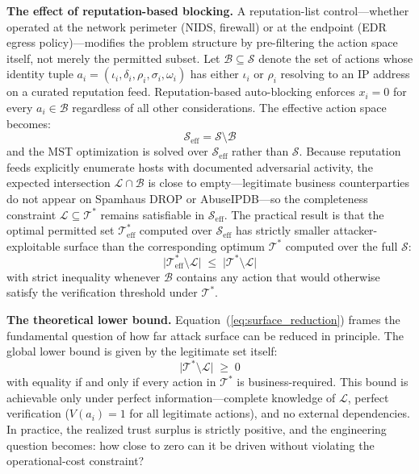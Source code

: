 \documentclass[unnumsec,webpdf,contemporary,large]{oup-authoring-template}
\theoremstyle{thmstyleone}
\theoremstyle{thmstyletwo}
\theoremstyle{thmstylethree}
\begin{document}
\begin{appendices}
\textbf{The effect of reputation-based blocking.} A reputation-list control---whether
operated at the network perimeter (NIDS, firewall) or at the endpoint (EDR egress
policy)---modifies the problem structure by pre-filtering the action space itself,
not merely the permitted subset. Let $\mathcal{B} \subseteq \mathcal{S}$ denote the
set of actions whose identity tuple $a_i = (\iota_i, \delta_i, \rho_i, \sigma_i,
\omega_i)$ has either $\iota_i$ or $\rho_i$ resolving to an IP address on a curated
reputation feed. Reputation-based auto-blocking enforces $x_i = 0$ for every
$a_i \in \mathcal{B}$ regardless of all other considerations. The effective action
space becomes:
\begin{equation}
\mathcal{S}_{\text{eff}} = \mathcal{S} \setminus \mathcal{B}
\label{eq:s_effective}
\end{equation}
and the MST optimization is solved over $\mathcal{S}_{\text{eff}}$ rather than
$\mathcal{S}$. Because reputation feeds explicitly enumerate hosts with documented
adversarial activity, the expected intersection
$\mathcal{L} \cap \mathcal{B}$ is close to empty---legitimate business counterparties
do not appear on Spamhaus DROP or AbuseIPDB---so the completeness constraint
$\mathcal{L} \subseteq \mathcal{T}^{*}$ remains satisfiable in $\mathcal{S}_{\text{eff}}$.
The practical result is that the optimal permitted set $\mathcal{T}^{*}_{\text{eff}}$
computed over $\mathcal{S}_{\text{eff}}$ has strictly smaller attacker-exploitable
surface than the corresponding optimum $\mathcal{T}^{*}$ computed over the full
$\mathcal{S}$:
\begin{equation}
\bigl|\mathcal{T}^{*}_{\text{eff}} \setminus \mathcal{L}\bigr|
\;\leq\;
\bigl|\mathcal{T}^{*} \setminus \mathcal{L}\bigr|
\label{eq:surface_reduction}
\end{equation}
with strict inequality whenever $\mathcal{B}$ contains any action that would otherwise
satisfy the verification threshold under $\mathcal{T}^{*}$.

\textbf{The theoretical lower bound.} Equation~(\ref{eq:surface_reduction}) frames
the fundamental question of how far attack surface can be reduced in principle. The
global lower bound is given by the legitimate set itself:
\begin{equation}
\bigl|\mathcal{T}^{*} \setminus \mathcal{L}\bigr| \;\geq\; 0
\label{eq:global_bound}
\end{equation}
with equality if and only if every action in $\mathcal{T}^{*}$ is business-required.
This bound is achievable only under perfect information---complete knowledge of
$\mathcal{L}$, perfect verification ($V(a_i) = 1$ for all legitimate actions), and
no external dependencies. In practice, the realized trust surplus is strictly
positive, and the engineering question becomes: how close to zero can it be driven
without violating the operational-cost constraint?


\end{appendices}
\end{document}
